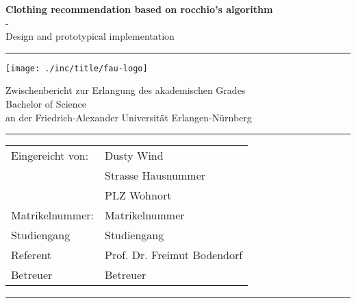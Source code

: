 

\newcommand{\TitleHRule}{\rule{\linewidth}{0.5mm}}

\begin{titlepage}

    \begin{center}

    { \huge \bfseries Clothing recommendation based on rocchio's algorithm\\[0.4cm]}
    { \huge -\\[0.4cm]}
    { \huge Design and prototypical implementation}
    
    \TitleHRule
    \bigskip

    \texttt{[image: ./inc/title/fau-logo]}
    \bigskip

    Zwischenbericht zur Erlangung des akademischen Grades\\
    Bachelor of Science\\
    an der Friedrich-Alexander Universit\"at Erlangen-N\"urnberg\\

    \TitleHRule

    \begin{tabular}{ l l }
        Eingereicht von:    & Dusty Wind\\
                            & Strasse Hausnummer\\
                            & PLZ Wohnort\\
        Matrikelnummer:     & Matrikelnummer\\
        Studiengang         & Studiengang\\
        Referent            & Prof. Dr. Freimut Bodendorf\\
        Betreuer            & Betreuer
    \end{tabular}

    \TitleHRule
    


    \end{center}

\end{titlepage}






